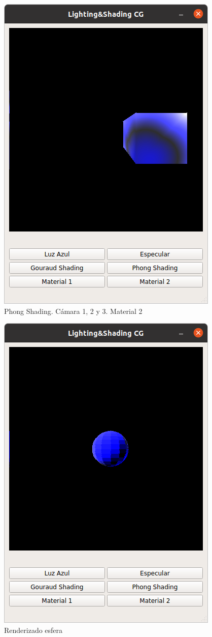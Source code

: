 \documentclass[12pt]{article}
\begin{document}
\begin{figure}[H]
\includegraphics[scale=0.5]{images/ej6.png}
\caption{Phong Shading. Cámara 1, 2 y 3. Material 2}
\end{figure}


\begin{figure}[H]
\centering
\includegraphics[scale=0.5]{images/esfera.png}

\caption{Renderizado esfera}
\end{figure}

\begin{thebibliography}{99}



\end{thebibliography}
\end{document}
